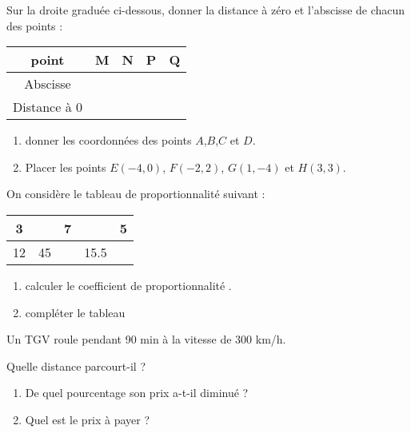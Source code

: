 \documentclass[a4paper,12pt]{article}
\begin{document}
\begin{exo}
Sur la droite graduée ci-dessous, donner la distance à zéro et l’abscisse de chacun des points   :


\begin{tabular}{|c|c|c|c|c|}
\hline 
point & M & N & P & Q \\ 
\hline 
Abscisse &  &  &  &  \\ 
\hline 
Distance à 0 &  &  &  &  \\ 
\hline 
\end{tabular} 
\begin{enumerate}
\item donner les coordonnées des points $A$,$B$,$C$ et $D$.
\item Placer les points $E(-4, 0)$, $F(-2, 2)$, $G(1, -4)$ et $H(3, 3)$.
\end{enumerate}
\begin{reper}
\end{reper}
\end{exo}

\begin{exo}
On considère le tableau de proportionnalité suivant :
\begin{tabular}{|c|c|c|c|c|}
\hline 
3 &  & 7 &  & 5 \\ 
\hline 
12 & 45 &  & 15.5 &  \\ 
\hline 
\end{tabular} 
\begin{enumerate}
\item calculer le coefficient de proportionnalité .
\item compléter le tableau 
\end{enumerate}
\end{exo}


\begin{exo}
Un TGV roule pendant 90 min  à la vitesse de 300 km/h.

Quelle distance parcourt-il ?
\end{exo}

\begin{exo}
\begin{enumerate}
\item  De quel pourcentage son prix a-t-il diminué ?
\item Quel est le prix à payer ?
\end{enumerate}
\end{exo}
\end{document}

